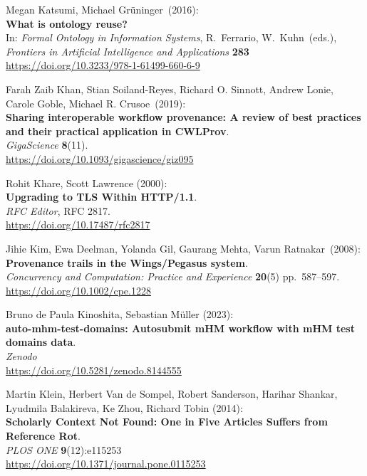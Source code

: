 \begin{thebibliography}{9}
Megan Katsumi, Michael Grüninger~(2016):\\
\textbf{What is ontology reuse?}\\
In: \emph{Formal Ontology in Information Systems}, R.~Ferrario, 
W.~Kuhn~(eds.),\\
\emph{Frontiers in Artificial Intelligence and Applications}
\textbf{283}\\
\url{https://doi.org/10.3233/978-1-61499-660-6-9}

Farah Zaib Khan, Stian Soiland-Reyes, Richard O. Sinnott,
Andrew Lonie, Carole Goble, Michael R. Crusoe~(2019):\\
\textbf{Sharing interoperable workflow provenance: A review of best
practices and their practical application in CWLProv}.\\
\emph{GigaScience} \textbf{8}(11).\\
\url{https://doi.org/10.1093/gigascience/giz095}

Rohit Khare, Scott Lawrence (2000): \\
\textbf{Upgrading to {TLS Within HTTP}/1.1}.\\
\emph{RFC Editor}, RFC 2817. \\
\url{https://doi.org/10.17487/rfc2817}

Jihie Kim, Ewa Deelman, Yolanda Gil, Gaurang Mehta, Varun
Ratnakar~(2008):\\
\textbf{Provenance trails in the Wings/Pegasus system}.\\
\emph{Concurrency and Computation: Practice and Experience}
\textbf{20}(5) pp.~587--597.\\
\url{https://doi.org/10.1002/cpe.1228}

Bruno de Paula Kinoshita, Sebastian Müller (2023):\\
\textbf{auto-mhm-test-domains: Autosubmit mHM workflow with mHM test domains data}.\\
\emph{Zenodo}\\
\url{https://doi.org/10.5281/zenodo.8144555}

Martin Klein, Herbert Van de Sompel, Robert Sanderson, Harihar Shankar,
Lyudmila Balakireva, Ke Zhou, Richard Tobin (2014): \\
\textbf{Scholarly Context Not Found: One in Five Articles Suffers from Reference Rot}.\\
\emph{PLOS ONE} \textbf{9}(12):e115253\\
\url{https://doi.org/10.1371/journal.pone.0115253}


\end{thebibliography}

